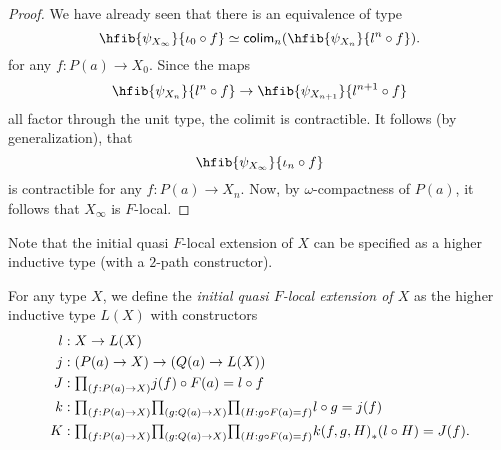 \begin{proof}
We have already seen that there is an equivalence of type
\begin{equation*}
\eqv{\hfib{\psi_{X_\infty}}{\iota_0\circ f}}{\tfcolim_n(\hfib{\psi_{X_n}}{l^n\circ f})}.
\end{equation*}
for any $f:P(a)\to X_0$. Since the maps
\begin{equation*}
\hfib{\psi_{X_n}}{l^n\circ f}\to \hfib{\psi_{X_{n+1}}}{l^{n+1}\circ f}
\end{equation*}
all factor through the unit type, the colimit is contractible. It follows (by generalization), that
\begin{equation*}
\hfib{\psi_{X_\infty}}{\iota_n\circ f}
\end{equation*}
is contractible for any $f:P(a)\to X_n$. Now, by $\omega$-compactness of $P(a)$, it follows that $X_\infty$ is $F$-local.
\end{proof}

Note that the initial quasi $F$-local extension of $X$ can be specified as a higher inductive type (with a $2$-path constructor).

\begin{defn}
For any type $X$, we define the \emph{initial quasi $F$-local extension of $X$} as
the higher inductive type $L(X)$ with constructors
\begin{align*}
l & : X\to L(X) \\
j & : (P(a)\to X) \to (Q(a)\to L(X)) \\
J & : \prd{f:P(a)\to X} j(f)\circ F(a) = l\circ f \\
k & : \prd{f:P(a)\to X}{g:Q(a)\to X}{H:g\circ F(a)=f} l\circ g = j(f) \\
K & : \prd{f:P(a)\to X}{g:Q(a)\to X}{H:g\circ F(a)=f} \trans{k(f,g,H)}{l\circ H} = J(f).
\end{align*}
\end{defn}

